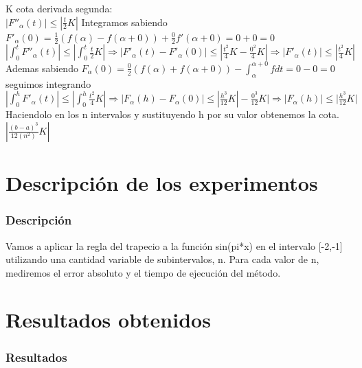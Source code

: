 \documentclass{beamer}
\begin{document}
\begin {frame}
K cota derivada segunda:\\
$|F''_\alpha(t)| \leq |\frac{t}{2} K|$
\pause
Integramos sabiendo $F'_\alpha(0)=\frac {1}{2} \left(f(\alpha)-f(\alpha+0) \right)+ \frac{0}{2} f'(\alpha+0)=0+0=0$\\
\pause
$|\int_0^t F''_\alpha(t)| \leq |\int_0^t\frac{t}{2} K| \Rightarrow |F'_\alpha(t)-F'_\alpha(0)| \leq |\frac{t^2}{4} K-\frac{0^2}{4} K| \Rightarrow |F'_\alpha(t)| \leq |\frac{t^2}{4} K|$
\pause
Ademas sabiendo
$F_\alpha(0)=\frac{0}{2} \left(f(\alpha)+f(\alpha+0) \right)-\int_\alpha ^{\alpha+0} f dt=0-0=0$ seguimos integrando\\

$|\int_0^h F'_\alpha(t)|\leq|\int_0^h \frac{t^2}{4} K| \Rightarrow |F_\alpha(h)-F_\alpha(0)| \leq |\frac{h^3}{12} K|-\frac{0^3}{12} K|\Rightarrow |F_\alpha(h)| \leq |\frac{h^3}{12} K|$
\pause
Haciendolo en los n intervalos y sustituyendo h por su valor obtenemos la cota.\\

$|\frac{(b-a)^3}{12 (n^2)} K|$
\end{frame}
\section{Descripción de los experimentos}
\begin{frame}
  \frametitle{Descripción}
  Vamos a aplicar la regla del trapecio a la función sin(pi*x) en el intervalo [-2,-1] utilizando una cantidad variable de subintervalos, n. Para cada valor de n, mediremos el error absoluto y el tiempo de ejecución del método.
\end{frame}

\section{Resultados obtenidos}
\begin{frame}
  \frametitle{Resultados}
  
\end{frame}
\end{document}
